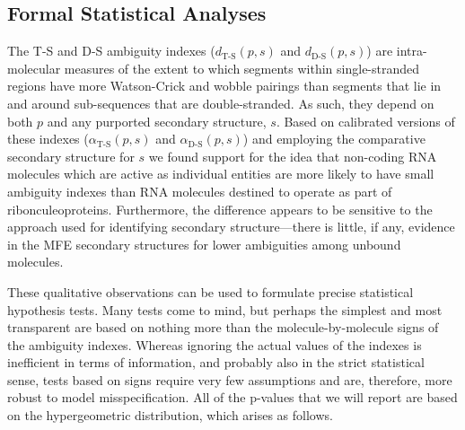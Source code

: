 \documentclass[10pt,letterpaper]{article}
\begin{document}
\subsection*{Formal Statistical Analyses}
The T-S and D-S ambiguity indexes ($d_\text{T-S}(p,s)$ and $d_\text{D-S}(p,s)$)  are intra-molecular measures of the extent to which segments within single-stranded regions have more Watson-Crick and wobble pairings than segments that lie in and around sub-sequences that are double-stranded. As such, they depend on both $p$ and any purported secondary structure, $s$. Based on calibrated versions of these indexes ($\alpha_\text{T-S}(p,s)$ and $\alpha_\text{D-S}(p,s)$) and employing the comparative secondary structure for $s$ we found support for the idea that non-coding RNA molecules which are active as individual entities are more likely to have small ambiguity indexes than RNA molecules destined to operate as part of ribonculeoproteins. Furthermore, the difference appears to be sensitive to the approach used for identifying secondary structure---there is little, if any, evidence in the MFE secondary structures for lower ambiguities among unbound molecules.

These qualitative observations can be used to formulate precise statistical hypothesis tests.  Many tests come to mind, but perhaps the simplest and most transparent are based on nothing more than the molecule-by-molecule signs of the ambiguity indexes. Whereas ignoring the actual values of the indexes is inefficient in terms of information, and probably also in the strict statistical sense, tests based on signs require very few assumptions and are, therefore, more robust to model misspecification. All of the p-values that we will report are based on the hypergeometric distribution, which arises as follows.
\end{document}
